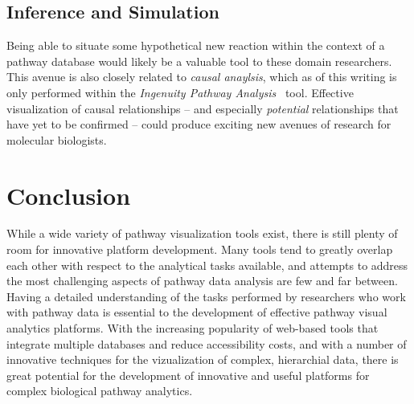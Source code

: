 \documentclass[review,journal]{vgtc}         %
\newcounter{task}
\begin{document}
\subsection{Inference and Simulation}

Being able to situate some hypothetical new reaction within the context of a pathway database would likely be a valuable tool to these domain researchers. This avenue is also closely related to \emph{causal anaylsis}, which as of this writing is only performed within the \emph{Ingenuity Pathway Analysis}~\cite{Kramer2013ipa-causal} tool. Effective visualization of causal relationships -- and especially \emph{potential} relationships that have yet to be confirmed -- could produce exciting new avenues of research for molecular biologists.

\section{Conclusion}

While a wide variety of pathway visualization tools exist, there is still plenty of room for innovative platform development. Many tools tend to greatly overlap each other with respect to the analytical tasks available, and attempts to address the most challenging aspects of pathway data analysis are few and far between. Having a detailed understanding of the tasks performed by researchers who work with pathway data is essential to the development of effective pathway visual analytics platforms. With the increasing popularity of web-based tools that integrate multiple databases and reduce accessibility costs, and with a number of innovative techniques for the vizualization of complex, hierarchial data, there is great potential for the development of innovative and useful platforms for complex biological pathway analytics.



\end{document}
